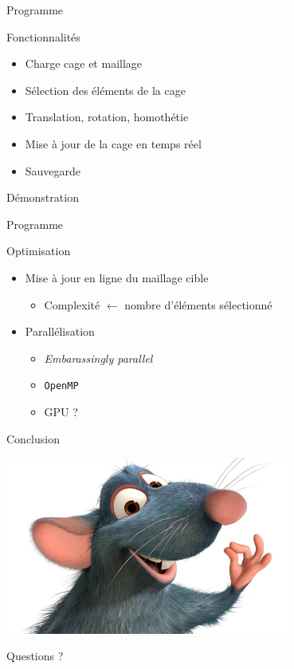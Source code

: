 \documentclass{beamer}
\begin{document}
\begin{frame}{Programme}

\begin{block}{Fonctionnalités}
\begin{itemize}
\item Charge cage et maillage
\item Sélection des éléments de la cage
\item Translation, rotation, homothétie
\item Mise à jour de la cage en temps réel
\item Sauvegarde
\end{itemize}
\end{block}

\alert{Démonstration}

\end{frame}

\begin{frame}{Programme}
\begin{block}{Optimisation}
\begin{itemize}
\item Mise à jour en ligne du maillage cible
\begin{itemize}
\item Complexité $\leftarrow$ nombre d'éléments sélectionné
\end{itemize}
\item Parallélisation
\begin{itemize}
	\item \textit{Embarassingly parallel}
	\item \texttt{OpenMP}
	\item GPU ?
\end{itemize}
\end{itemize}
\end{block}
\end{frame}

\begin{frame}{Conclusion}
\begin{center}
\includegraphics[width=0.7\textwidth]{ratatouille}
\end{center}
Questions ?
\end{frame}
\end{document}
